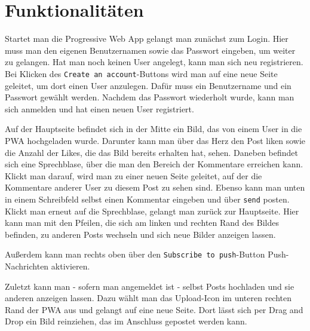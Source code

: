 \chapter{Funktionalitäten}

Startet man die Progressive Web App gelangt man zunächst zum Login. Hier muss man den eigenen Benutzernamen sowie das Passwort eingeben, um weiter zu gelangen. Hat man noch keinen User angelegt, kann man sich neu registrieren. Bei Klicken des \texttt{Create an account}-Buttons wird man auf eine neue Seite geleitet, um dort einen User anzulegen. Dafür muss ein Benutzername und ein Passwort gewählt werden. Nachdem das Passwort wiederholt wurde, kann man sich anmelden und hat einen neuen User registriert.

Auf der Hauptseite befindet sich in der Mitte ein Bild, das von einem User in die PWA hochgeladen wurde. Darunter kann man über das Herz den Post liken sowie die Anzahl der Likes, die das Bild bereits erhalten hat, sehen. Daneben befindet sich eine Sprechblase, über die man den Bereich der Kommentare erreichen kann. Klickt man darauf, wird man zu einer neuen Seite geleitet, auf der die Kommentare anderer User zu diesem Post zu sehen sind. Ebenso kann man unten in einem Schreibfeld selbst einen Kommentar eingeben und über \texttt{send} posten. Klickt man erneut auf die Sprechblase, gelangt man zurück zur Hauptseite. Hier kann man mit den Pfeilen, die sich am linken und rechten Rand des Bildes befinden, zu anderen Posts wechseln und sich neue Bilder anzeigen lassen.

Außerdem kann man rechts oben über den \texttt{Subscribe to push}-Button Push-Nachrichten aktivieren. 

Zuletzt kann man - sofern man angemeldet ist - selbst Posts hochladen und sie anderen anzeigen lassen. Dazu wählt man das Upload-Icon im unteren rechten Rand der PWA aus und gelangt auf eine neue Seite. Dort lässt sich per Drag and Drop ein Bild reinziehen, das im Anschluss gepostet werden kann. 
